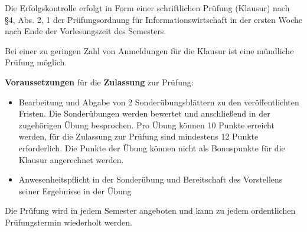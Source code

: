 \begin{course}

\setdoclanguagegerman
{}



\coursehead


\label{cour_4637.dp_997}


\begin{styleenv}
\begin{assessment}
Die Erfolgskontrolle erfolgt in Form einer schriftlichen Prüfung (Klausur) nach §4, Abs. 2, 1 der Prüfungsordnung für Informationswirtschaft in der ersten Woche nach Ende der Vorlesungszeit des Semesters.

 

Bei einer zu geringen Zahl von Anmeldungen für die Klausur ist eine mündliche Prüfung möglich.

 

\textbf{Voraussetzungen} für die \textbf{Zulassung} zur Prüfung:

 \begin{itemize}\item Bearbeitung und Abgabe von 2 Sonderübungsblättern zu den veröffentlichten Fristen. Die Sonderübungen werden bewertet und anschließend in der zugehörigen Übung besprochen. Pro Übung können 10 Punkte erreicht werden, für die Zulassung zur Prüfung sind mindestens 12 Punkte erforderlich. Die Punkte der Übung können nicht als Bonuspunkte für die Klausur angerechnet werden.  \item Anwesenheitspflicht in der Sonderübung und Bereitschaft des Vorstellens seiner Ergebnisse in der Übung  \end{itemize}

Die Prüfung wird in jedem Semester angeboten und kann zu jedem ordentlichen Prüfungstermin wiederholt werden.


\end{assessment}


\end{styleenv}
\end{course}
